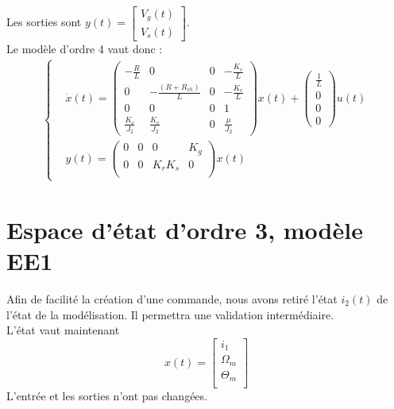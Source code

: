 \noindent Les sorties sont $y(t)= \begin{bmatrix}
V_g(t)\\
V_s(t)
\end{bmatrix}$.\\

\noindent Le modèle d'ordre 4 vaut donc :
\begin{align}
\label{EE0}
\left\lbrace
\begin{aligned}
&\dot{x}(t) = \begin{pmatrix}
-\frac{R}{L}	& 	    0				& 0 &   -\frac{K_e}{L}	\\
      0			&  -\frac{(R+R_{ch})}{L}&0	&	-\frac{K_e}{L}	\\
0&	0&	0 & 1\\
\frac{K_c}{J_2}	&	\frac{K_c}{J_2}		&0&	\frac{\mu}{J_2}
\end{pmatrix}x(t)+\begin{pmatrix}
\frac{1}{L}\\0\\0\\0
\end{pmatrix}u(t)\\
&y(t) = \begin{pmatrix}
0&	0&	0 & K_g	\\
0&	0&	K_rK_s	&	0\\
\end{pmatrix}x(t)
\end{aligned}
\right.
\end{align}
\section{Espace d'état d'ordre 3, modèle EE1}
Afin de facilité la création d'une commande, nous avons retiré l'état $i_2(t)$ de l'état de la modélisation. Il permettra une validation intermédiaire. \\

\noindent L'état vaut maintenant \begin{equation}
x(t)=\begin{bmatrix}
i_1\\
\Omega_m\\
\Theta_m\\
\end{bmatrix}
\end{equation} 
\noindent L'entrée et les sorties n'ont pas changées. \\

